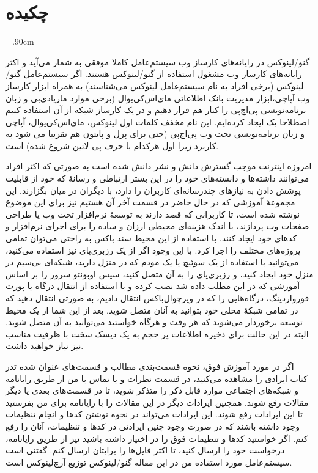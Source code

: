 \chapter*{چکیده}
\baselineskip=.90cm

گنو/لینوکس در رایانه‌های کارساز وب سیستم‌عامل کاملا موفقی به شمار می‌آید و اکثر رایانه‌های کارساز وب مشغول استفاده از گنو/لینوکس هستند. اگر  سیستم‌عامل گنو/لینوکس (برخی افراد به نام سیستم‌عامل لینوکس می‌شناسند) به همراه ابزار کارساز وب آپاچی،ابزار  مدیریت بانک اطلاعاتی مای‌اس‌کی‌یو‌ال (برخی موارد ماریا‌دی‌بی و زبان برنامه‌نویسی پی‌اچ‌پی را کنار هم قرار دهیم و در یک کارساز شبکه از آن استفاده کنیم اصطلاحا یک {} ایجاد کرده‌ایم. این نام مخفف کلمات اول لینوکس، مای‌اس‌کی‌یو‌ال، آپاچی و زبان برنامه‌نویسی تحت وب پی‌اچ‌پی (حتی برای پرل و پایتون هم تقریبا می شود به کاربرد زیرا اول هرکدام  با حرف پی لاتین شروع شده) است.

امروزه اینترنت موجب گسترش دانش و نشر دانش شده است به صورتی که اکثر افراد می‌توانند داشته‌ها و دانسته‌های خود را در این بستر ارتباطی و رسانهٔ که خود از قابلیت پوشش دادن به نیازهای چندرسانه‌ای کاربران را دارد، با دیگران در میان بگزارند. این مجموعهٔ آموزشی که در حال حاضر در قسمت آخر آن هستیم نیز برای این موضوع نوشته شده است، تا کاربرانی که قصد دارند به توسعهٔ نرم‌افزار تحت وب یا طراحی صفحات وب پردازند، با اندک هزینه‌ای محیطی ارزان و ساده را برای اجرای نرم‌افزار و کدهای خود ایجاد کنند.  با استفاده از این محیط سند باکس به راحتی می‌توان تمامی پروژه‌های مختلف را اجرا کرد.
با این وجود اگر از یک رزبری‌پای نیز استفاده می‌کنید، می‌توانید با استفاده از یک سوئیچ یا یک مودم که در منزل دارید، شبکه‌ای بی‌سیم در منزل خود ایجاد کنید، و رزبری‌پای را به آن متصل کنید، سپس اوبونتو سرور را بر اساس آموزشی که در این مطلب داده شد نصب کرده و با استفاده از انتقال درگاه یا پورت فورواردینگ، درگاه‌هایی را که در ویرچوال‌باکس انتقال دادیم، به صورتی انتقال دهید که در تمامی شبکهٔ محلی خود بتوانید به آنان متصل شوید.  بعد از این شما از یک محیط توسعه برخوردار می‌شوید که هر وقت و هرگاه خواستید می‌توانید به آن متصل شوید. البته در این حالت برای ذخیره اطلاعات پر حجم به یک دیسک سخت با ظرفیت مناسب نیز نیاز خواهید داشت.

اگر در مورد آموزش فوق، نحوه قسمت‌بندی مطالب و قسمت‌های عنوان شده تدر کتاب ایرادی را مشاهده می‌کنید، در قسمت نظرات و یا تماس با من از طریق رایانامه و شبکه‌های اجتماعی موارد قابل ذکر را متذکر شوید، تا در قسمت‌های بعدی یا دیگر مقالات رفع شوند. همچنین ایرادات دیگر در این مقالات را با رایانامه برای من بفرستید تا این ایرادات رفع شوند. این ایرادات می‌تواند در نحوه نوشتن کدها و انجام تنظیمات وجود داشته باشند که در صورت وجود چنین ایرادتی در کدها و تنظیمات، آنان را رفع کنم. اگر خواستید کدها و تنظیمات فوق را در اختیار داشته باشید نیز از طریق رایانامه، درخواست خود را ارسال کنید، تا اکثر فایل‌ها را برایتان ارسال کنم. گفتنی است سیستم‌عامل مورد استفاده من در این مقاله گنو/لینوکس توزیع آرچ‌لینوکس است.

